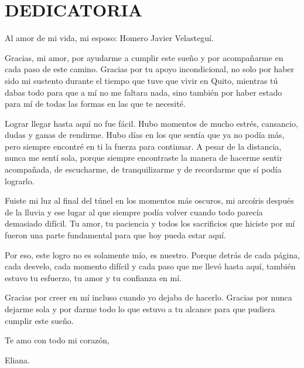 \section*{DEDICATORIA}

Al amor de mi vida, mi esposo: Homero Javier Velasteguí.

Gracias, mi amor, por ayudarme a cumplir este sueño y por acompañarme en cada paso de este camino. Gracias por tu apoyo incondicional, no solo por haber sido mi sustento durante el tiempo que tuve que vivir en Quito, mientras tú dabas todo para que a mí no me faltara nada, sino también por haber estado para mí de todas las formas en las que te necesité.

Lograr llegar hasta aquí no fue fácil. Hubo momentos de mucho estrés, cansancio, dudas y ganas de rendirme. Hubo días en los que sentía que ya no podía más, pero siempre encontré en ti la fuerza para continuar. A pesar de la distancia, nunca me sentí sola, porque siempre encontraste la manera de hacerme sentir acompañada, de escucharme, de tranquilizarme y de recordarme que sí podía lograrlo.

Fuiste mi luz al final del túnel en los momentos más oscuros, mi arcoíris después de la lluvia y ese lugar al que siempre podía volver cuando todo parecía demasiado difícil. Tu amor, tu paciencia y todos los sacrificios que hiciste por mí fueron una parte fundamental para que hoy pueda estar aquí.

Por eso, este logro no es solamente mío, es nuestro. Porque detrás de cada página, cada desvelo, cada momento difícil y cada paso que me llevó hasta aquí, también estuvo tu esfuerzo, tu amor y tu confianza en mí.

Gracias por creer en mí incluso cuando yo dejaba de hacerlo. Gracias por nunca dejarme sola y por darme todo lo que estuvo a tu alcance para que pudiera cumplir este sueño.


\vspace{1.2cm}


Te amo con todo mi corazón,


\vspace{1.2cm}



Eliana.

